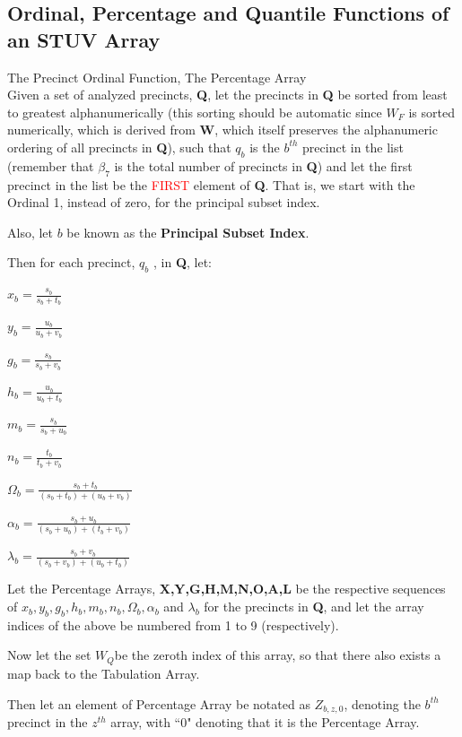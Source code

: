 \subsection{Ordinal, Percentage and Quantile Functions of an STUV Array}
\begin{definition}{The Precinct Ordinal Function, The Percentage Array}\\
Given a set of analyzed precincts, \textbf{Q}, let the precincts in \textbf{Q} be sorted from least to greatest alphanumerically (this sorting should be automatic since $W_{F}$ is sorted numerically, which is derived from \textbf{W}, which itself preserves the alphanumeric ordering of all precincts in \textbf{Q}), such that $q_{b}$ is the $b^{th}$ precinct in the list (remember that $\beta_{7}$ is the total number of precincts in \textbf{Q}) and let the first precinct in the list be the \textcolor{red}{FIRST} element of \textbf{Q}. That is, we start with the Ordinal 1, instead of zero, for the principal subset index.

Also, let $b$ be known as the \textbf{Principal Subset Index}.

Then for each precinct, $q_{b}$ , in \textbf{Q}, let:

$x_{b}=\frac{s_{b}}{s_{b}+t_{b}}$

$y_{b}=\frac{u_{b}}{u_{b}+v_{b}}$

$g_{b}=\frac{s_{b}}{s_{b}+v_{b}}$

$h_{b}=\frac{u_{b}}{u_{b}+t_{b}}$

$m_{b}=\frac{s_{b}}{s_{b}+u_{b}}$

$n_{b}=\frac{t_{b}}{t_{b}+v_{b}}$

$\Omega_{b}=\frac{s_{b}+t_{b}}{(s_{b}+t_{b})+(u_{b}+v_{b})}$

$\alpha_{b}=\frac{s_{b}+u_{b}}{(s_{b}+u_{b})+(t_{b}+v_{b})}$

$\lambda_{b}=\frac{s_{b}+v_{b}}{(s_{b}+v_{b})+(u_{b}+t_{b})}$

Let the Percentage Arrays, \textbf{X,Y,G,H,M,N,O,A,L} be the respective sequences of $x_{b}, y_{b}, g_{b}, h_{b}, m_{b}, n_{b}, \Omega_{b}, \alpha_{b}$ and $\lambda_{b}$ for the precincts in \textbf{Q}, and let the array indices of the above be numbered from 1 to 9 (respectively).

Now let the set $W_{Q}$be the zeroth index of this array, so that there also exists a map back to the Tabulation Array.

Then let an element of Percentage Array be notated as $Z_{b,z,0}$, denoting the $b^{th}$ precinct in the $z^{th}$ array, with ``0" denoting that it is the Percentage Array.


\end{definition}
